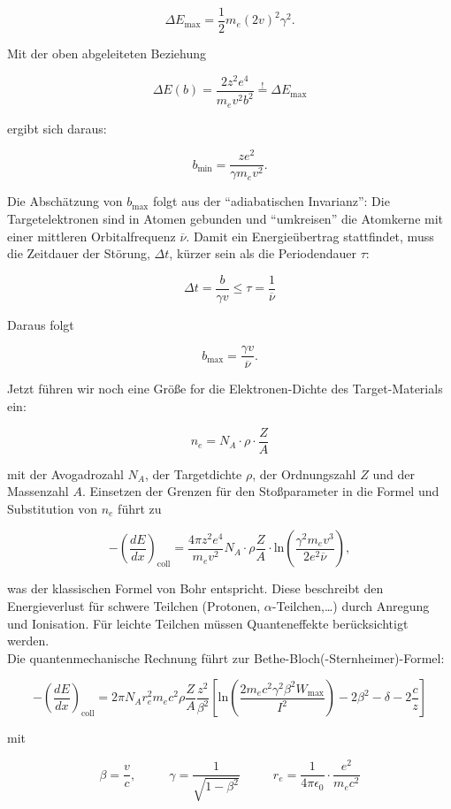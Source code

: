 \[\Delta E_{\text{max}}=\frac{1}{2}m_e(2v)^2\gamma^2.\]

Mit der oben abgeleiteten Beziehung

\[\Delta E(b)=\frac{2z^2e^4}{m_ev^2b^2}\overset{!}{=}\Delta E_{\text{max}}\]

ergibt sich daraus:

\[b_{\text{min}}=\frac{ze^2}{\gamma m_e v^2}.\]

Die Abschätzung von $b_{\text{max}}$ folgt aus der "`adiabatischen Invarianz"': Die Targetelektronen
sind in Atomen gebunden und "`umkreisen"' die Atomkerne mit einer mittleren Orbitalfrequenz
$\overline{\nu}$. Damit ein Energieübertrag stattfindet, muss die Zeitdauer der Störung, $\Delta t$,
kürzer sein als die Periodendauer $\tau$:

\[\Delta t=\frac{b}{\gamma v} \le \tau =\frac{1}{\overline{\nu}}\]

Daraus folgt

\[b_{\text{max}}=\frac{\gamma v}{\overline{\nu}}.\]

Jetzt führen wir noch eine Größe for die Elektronen-Dichte des Target-Materials ein:

\[n_e=N_A\cdot \rho\cdot \frac{Z}{A}\]

mit der Avogadrozahl $N_A$, der Targetdichte $\rho$, der Ordnungszahl $Z$ und der Massenzahl $A$.
Einsetzen der Grenzen für den Stoßparameter in die Formel und Substitution von $n_e$ führt zu

\[-\left(\frac{dE}{dx}\right)_{\text{coll}} = \frac{4\pi z^2e^4}{m_ev^2}N_A\cdot \rho
\frac{Z}{A}\cdot\text{ln}\left(\frac{\gamma^2 m_e v^3}{2e^2\overline{\nu}}\right), \]

was der klassischen Formel von Bohr entspricht. Diese beschreibt den Energieverlust für schwere
Teilchen (Protonen, $\alpha$-Teilchen,\ldots) durch Anregung und Ionisation. Für leichte Teilchen
müssen Quanteneffekte berücksichtigt werden.
\\
Die quantenmechanische Rechnung führt zur Bethe-Bloch(-Sternheimer)-Formel:

\[-\left(\frac{dE}{dx}\right)_{\text{coll}} = 2\pi N_A r_e^2 m_e c^2 \rho \frac{Z}{A}
\frac{z^2}{\beta^2}\left[ \text{ln} \left( \frac{2m_e c^2 \gamma^2 \beta^2 W_{\text{max}}}{I^2}
\right) -2\beta^2 -\delta -2\frac{c}{z} \right]\]

mit 

\[\beta =
\frac{v}{c},~~~~~~~~~~~~\gamma=\frac{1}{\sqrt{1-\beta^2}}~~~~~~~~~~~~
r_e=\frac{1}{4\pi\epsilon_0}\cdot\frac{e^2}{m_e c^2}\]

